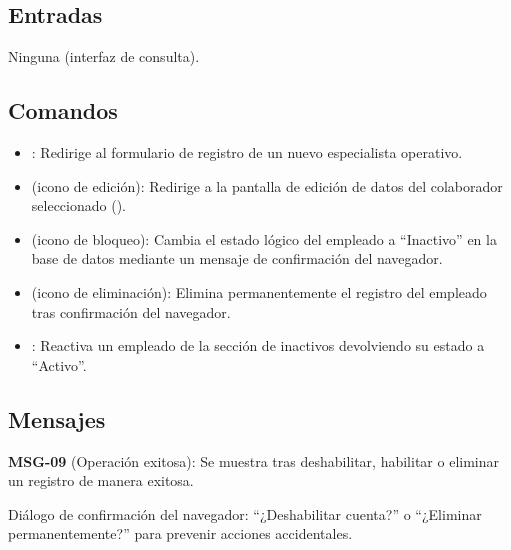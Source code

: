 \subsection{Entradas}
	Ninguna (interfaz de consulta).

\subsection{Comandos}
	\begin{itemize}
		\item {}: Redirige al formulario de registro de un nuevo especialista operativo.
		\item {} (icono de edición): Redirige a la pantalla de edición de datos del colaborador seleccionado ().
		\item {} (icono de bloqueo): Cambia el estado lógico del empleado a ``Inactivo'' en la base de datos mediante un mensaje de confirmación del navegador.
		\item {} (icono de eliminación): Elimina permanentemente el registro del empleado tras confirmación del navegador.
		\item {}: Reactiva un empleado de la sección de inactivos devolviendo su estado a ``Activo''.
	\end{itemize}

\subsection{Mensajes}
	\begin{Citemize}
		\item {\bf MSG-09} (Operación exitosa): Se muestra tras deshabilitar, habilitar o eliminar un registro de manera exitosa.
		\item Diálogo de confirmación del navegador: ``¿Deshabilitar cuenta?'' o ``¿Eliminar permanentemente?'' para prevenir acciones accidentales.
	\end{Citemize}
